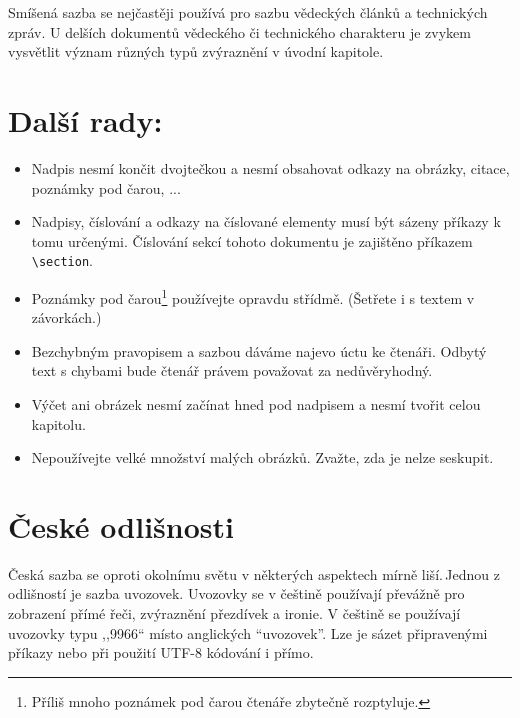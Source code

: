 \documentclass[twocolumn, 10pt, a4paper]{article}
\begin{document}
Smíšená sazba se nejčastěji používá pro sazbu vědec\-kých článků a technických zpráv.
U delších dokumentů vědeckého či technického charakteru je zvykem vysvětlit význam různých typů zvýraznění v úvodní kapitole.

\section{Další rady:}

\begin{itemize}

\item Nadpis nesmí končit dvojtečkou a nesmí obsahovat odkazy na obrázky, citace, poznámky pod čarou, ...

\item Nadpisy, číslování a odkazy na číslované elementy musí být sázeny příkazy k tomu určenými.
Číslo\-vání sekcí tohoto dokumentu je zajištěno příkazem \verb=\section=.

\item Poznámky pod čarou\footnote{Příliš mnoho poznámek pod čarou čtenáře zbytečně rozptyluje.} používejte opravdu střídmě.
(Šetřete i s textem v závorkách.)

\item Bezchybným pravopisem a sazbou dáváme najevo úctu ke čtenáři.
Odbytý text s chybami bude čtenář právem považovat za nedůvěryhodný.

\item Výčet ani obrázek nesmí začínat hned pod nadpisem a nesmí tvořit celou kapitolu.

\item Nepoužívejte velké množství malých obrázků.
Zvažte, zda je nelze seskupit.

\end{itemize}

\section{České odlišnosti}

Česká sazba se oproti okolnímu světu v některých aspektech mírně liší.\,Jednou z odlišností je sazba uvozovek. Uvozovky se v češtině používají převážně pro zobrazení přímé řeči, zvýraznění přezdívek a ironie.
V češtině se používají uvozovky typu ,,9966`` místo anglických ``uvozovek''.
Lze je sázet připravenými příkazy nebo při použití UTF-8 kódo\-vání i přímo.
\end{document}
